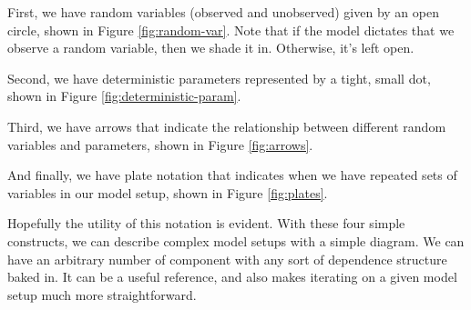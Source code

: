 First, we have random variables (observed and unobserved) given by an open circle, shown in Figure \ref{fig:random-var}. Note that if the model dictates that we observe a random variable, then we shade it in. Otherwise, it's left open.

Second, we have deterministic parameters represented by a tight, small dot, shown in Figure \ref{fig:deterministic-param}.

Third, we have arrows that indicate the relationship between different random variables and parameters, shown in Figure \ref{fig:arrows}.

And finally, we have plate notation that indicates when we have repeated sets of variables in our model setup, shown in Figure \ref{fig:plates}.

Hopefully the utility of this notation is evident. With these four simple constructs, we can describe complex model setups with a simple diagram. We can have an arbitrary number of component with any sort of dependence structure baked in. It can be a useful reference, and also makes iterating on a given model setup much more straightforward.

